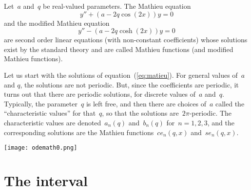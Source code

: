 Let~$a$ and~$q$ be real-valued parameters.
The Mathieu equation
\begin{equation}\label{eq:mathieu}
	y'' + (a-2q\cos(2x))y = 0
\end{equation}
and the modified Mathieu equation
\begin{equation}\label{eq:mathieumod}
	y'' - (a-2q\cosh(2x))y = 0
\end{equation}
are second order linear equations (with non-constant coefficients)
whose solutions exist by the standard theory and are called Mathieu
functions (and modified Mathieu functions).

Let us start with the solutions of equation~(\ref{eq:matieu}).  For
general values of~$a$ and $q$, the solutions are not periodic.  But,
since the coefficients are periodic, it turns out that there are
periodic solutions, for discrete values of~$a$ and~$q$.  Typically,
the parameter~$q$ is left free, and then there are choices
of~$a$ called the ``characteristic values'' for that~$q$, so that the
solutions are~$2\pi$-periodic.  The characteristic values are
denoted~$a_n(q)$ and~$b_n(q)$ for~$n=1,2,3$, and the corresponding
solutions are the Mathieu functions~$ce_n(q,x)$ and~$se_n(q,x)$.

\texttt{[image: odemath0.png]}






\clearpage
\section{The interval}

